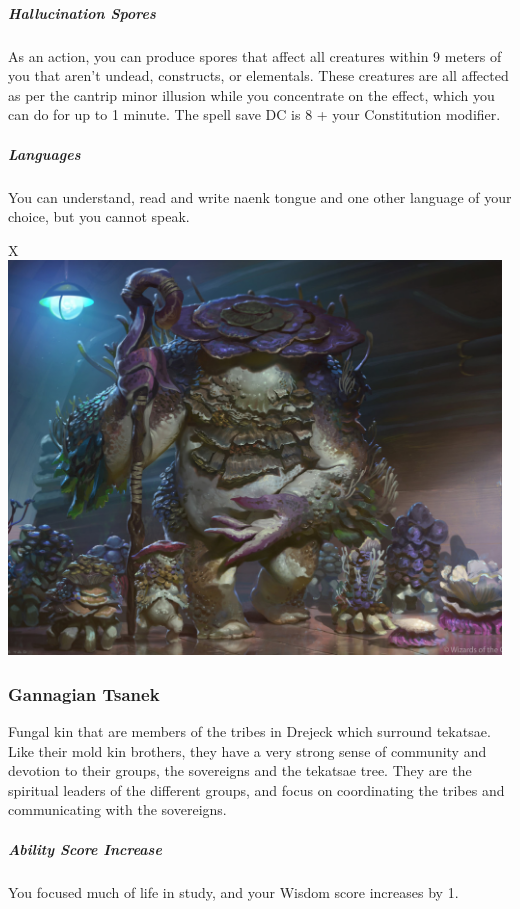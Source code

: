 \begin{linenumbers}
\subparagraph{Hallucination Spores} As an action, you can produce spores that affect all creatures within 9 meters of you that aren't undead, constructs, or elementals.
These creatures are all affected as per the cantrip minor illusion while you concentrate on the effect, which you can do for up to 1 minute.
The spell save DC is 8 + your Constitution modifier.

\subparagraph{Languages} You can understand, read and write naenk tongue and one other language of your choice, but you cannot speak.

\begin{table}[b]%
    \begin{DndTable}[width=\linewidth]{X}
        \includegraphics[width=0.98\textwidth]{02kins/img/16tsanek_sovereign.jpg}
    \end{DndTable}
\end{table}

\subsubsection{Gannagian Tsanek}
Fungal kin that are members of the tribes in Drejeck which surround tekatsae.
Like their mold kin brothers, they have a very strong sense of community and devotion to their groups, the sovereigns and the tekatsae tree.
They are the spiritual leaders of the different groups, and focus on coordinating the tribes and communicating with the sovereigns.

\subparagraph{Ability Score Increase} You focused much of life in study, and your Wisdom score increases by 1.


\end{linenumbers}
